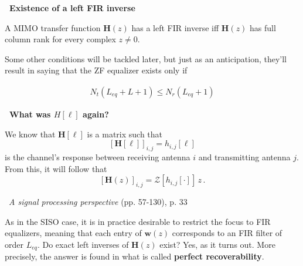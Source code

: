 \documentclass[a4paper, 12pt]{book}
\begin{document}
\vspace{1em}
\noindent
\colorbox{obsidianBlue}{%
    \begin{minipage}{\dimexpr\linewidth-2\fboxsep}
    \vspace{0.3em}
    \textcolor{obsidianTextBlue}{\textbf{\faPen\ Existence of a left FIR inverse}}
    
    A MIMO transfer function $\mathbf{H}(z)$ has a left FIR inverse iff $\mathbf{H}(z)$ has full column rank for every complex $z \neq 0$.
    \vspace{0.3em}
    \end{minipage}%
}
\vspace{1em}

Some other conditions will be tackled later, but just as an anticipation, they'll result in saying that the ZF equalizer exists only if

\begin{align}
    N_t(L_{eq} + L + 1) \leq N_r(L_{eq} + 1) \tag{2.146+}
\end{align}

\vspace{1em}
\noindent
\colorbox{obsidianPurple}{%
    \begin{minipage}{\dimexpr\linewidth-2\fboxsep}
    \vspace{0.3em}
    \textcolor{obsidianTextPurple}{\textbf{\faBook\ What was $H[\ell]$ again?}}
    
    We know that $\mathbf{H}[\ell]$ is a matrix such that
    \[ [\boldsymbol{H}[\ell]]_{i,j} = h_{i,j}[\ell] \]
    is the channel's response between receiving antenna $i$ and transmitting antenna $j$.\\
    From this, it will follow that
    \[ [\mathbf{H}(z)]_{i,j} = \mathcal{Z}[h_{i,j}[\cdot]] \, z \,. \]
    \vspace{0.1em}
    \end{minipage}%
}
\vspace{1em}

\vspace{1em}
\noindent
\colorbox{obsidianYellow}{%
    \begin{minipage}{\dimexpr\linewidth-2\fboxsep}
    \vspace{0.3em}
    \textcolor{obsidianTextYellow}{\small \faQuoteLeft\ \textit{A signal processing perspective} (pp. 57-130), p. 33}
    
    As in the SISO case, it is in practice desirable to restrict the focus to FIR equalizers, meaning that each entry of $\mathbf{w}(z)$ corresponds to an FIR filter of order $L_{eq}$. Do exact left inverses of $\mathbf{H}(z)$ exist? Yes, as it turns out. More precisely, the answer is found in what is called \textbf{perfect recoverability}.
    \vspace{0.3em}
    \end{minipage}%
}
\vspace{1em}
\end{document}
